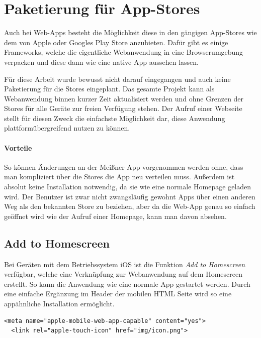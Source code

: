 
\section{Paketierung für App-Stores}
Auch bei Web-Apps besteht die Möglichkeit diese in den gängigen App-Stores wie dem von Apple oder Googles Play Store anzubieten. Dafür gibt es einige Frameworks, welche die eigentliche Webanwendung in eine Browserumgebung verpacken und diese dann wie eine native App aussehen lassen.\par
Für diese Arbeit wurde bewusst nicht darauf eingegangen und auch keine Paketierung für die Stores eingeplant. Das gesamte Projekt kann als Webanwendung binnen kurzer Zeit aktualisiert werden und ohne Grenzen der Stores für alle Geräte zur freien Verfügung stehen. Der Aufruf einer Webseite stellt für diesen Zweck die einfachste Möglichkeit dar, diese Anwendung plattformübergreifend nutzen zu können.

\paragraph{Vorteile}
So können Änderungen an der Meißner App vorgenommen werden ohne, dass man kompliziert über die Stores die App neu verteilen muss. Außerdem ist absolut keine Installation notwendig, da sie wie eine normale Homepage geladen wird. Der Benutzer ist zwar nicht zwangsläufig gewohnt Apps über einen anderen Weg als den bekannten Store zu beziehen, aber da die Web-App genau so einfach geöffnet wird wie der Aufruf einer Homepage, kann man davon absehen.

\subsection{Add to Homescreen}
Bei Geräten mit dem Betriebssystem iOS ist die Funktion \emph{Add to Homescreen} verfügbar, welche eine Verknüpfung zur Webanwendung auf dem Homescreen erstellt. So kann die Anwendung wie eine normale App gestartet werden. Durch eine einfache Ergänzung im Header der mobilen HTML Seite wird so eine appähnliche Installation ermöglicht.
\\
\begin{lstlisting}[captionpos=b, caption=Ergänzung im Header der mobilen Seite]
  <meta name="apple-mobile-web-app-capable" content="yes">
  <link rel="apple-touch-icon" href="img/icon.png">
\end{lstlisting}

